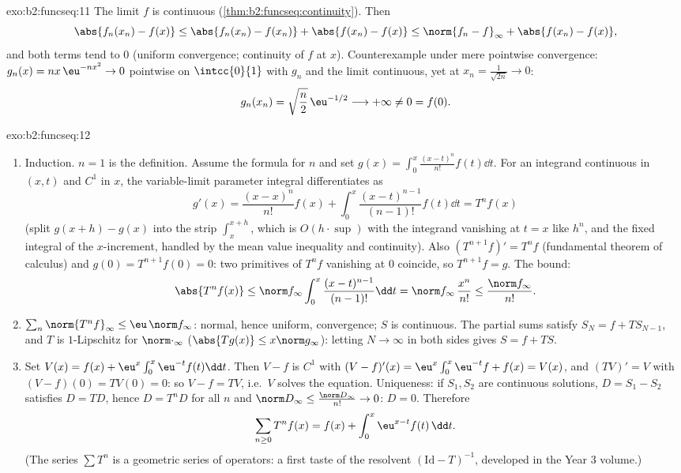 \begin{solution}{exo:b2:funcseq:11}
The limit $f$ is continuous (\cref{thm:b2:funcseq:continuity}).
Then
\[
\abs{f_n(x_n) - f(x)}
\leq \abs{f_n(x_n) - f(x_n)} + \abs{f(x_n) - f(x)}
\leq \norm{f_n - f}_\infty + \abs{f(x_n) - f(x)} ,
\]
and both terms tend to $0$ (uniform convergence; continuity of
$f$ at $x$). Counterexample under mere pointwise convergence:
$g_n(x) = nx\,\eu^{-nx^2} \to 0$ pointwise on $\intcc{0}{1}$
with $g_n$ and the limit continuous, yet at $x_n =
\frac{1}{\sqrt{2n}} \to 0$:
\[
g_n(x_n) = \sqrt{\frac n2}\,\eu^{-1/2} \longrightarrow +\infty
\neq 0 = f(0) .
\]
\end{solution}

\begin{solution}{exo:b2:funcseq:12}
\begin{enumerate}
  \item Induction. $n = 1$ is the definition. Assume the formula
        for $n$ and set $g(x) = \int_0^x \frac{(x-t)^n}{n!}
        f(t)\dd t$. For an integrand continuous in $(x,t)$ and
        $C^1$ in $x$, the variable-limit parameter integral
        differentiates as
        \[
        g'(x) = \frac{(x-x)^n}{n!}f(x)
        + \int_0^x \frac{(x-t)^{n-1}}{(n-1)!}f(t)\dd t
        = T^nf(x)
        \]
        (split $g(x+h) - g(x)$ into the strip
        $\int_x^{x+h}$, which is $O(h\cdot\sup)$ with the
        integrand vanishing at $t = x$ like $h^n$, and the fixed
        integral of the $x$-increment, handled by the mean value
        inequality and continuity). Also $(T^{n+1}f)' = T^nf$
        (fundamental theorem of calculus) and $g(0) =
        T^{n+1}f(0) = 0$: two primitives of $T^nf$ vanishing at
        $0$ coincide, so $T^{n+1}f = g$. The bound:
        \[
        \abs{T^nf(x)} \leq \norm f_\infty
        \int_0^x \frac{(x-t)^{n-1}}{(n-1)!}\dd t
        = \norm f_\infty\,\frac{x^n}{n!}
        \leq \frac{\norm f_\infty}{n!} .
        \]
  \item $\sum_n \norm{T^nf}_\infty \leq \eu\,\norm f_\infty$:
        normal, hence uniform, convergence; $S$ is continuous.
        The partial sums satisfy $S_N = f + T S_{N-1}$, and $T$
        is $1$-Lipschitz for $\norm\cdot_\infty$
        ($\abs{Tg(x)} \leq x\norm g_\infty$): letting $N \to
        \infty$ in both sides gives $S = f + TS$.
  \item Set $V(x) = f(x) + \eu^x\int_0^x \eu^{-t}f(t)\dd t$.
        Then $V - f$ is $C^1$ with $(V-f)'(x) =
        \eu^x\int_0^x\eu^{-t}f + f(x) = V(x)$, and $(TV)' = V$
        with $(V - f)(0) = TV(0) = 0$: so $V - f = TV$, i.e.\
        $V$ solves the equation. Uniqueness: if $S_1, S_2$ are
        continuous solutions, $D = S_1 - S_2$ satisfies $D =
        TD$, hence $D = T^nD$ for all $n$ and $\norm D_\infty
        \leq \frac{\norm D_\infty}{n!} \to 0$: $D = 0$.
        Therefore
        \[
        \sum_{n\geq0} T^nf(x) = f(x) +
        \int_0^x \eu^{x-t}f(t)\,\dd t .
        \]
        (The series $\sum T^n$ is a geometric series of
        operators: a first taste of the resolvent
        $(\mathrm{Id} - T)^{-1}$, developed in the Year 3
        volume.)
\end{enumerate}
\end{solution}

